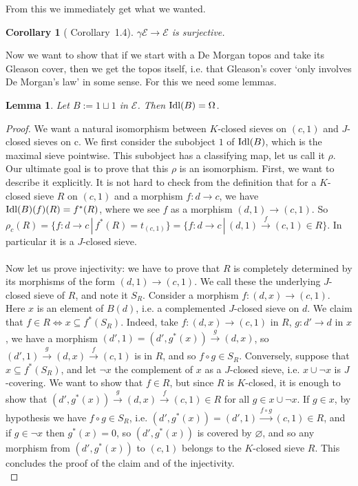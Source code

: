 \documentclass{article}
\newtheorem{Lemma}[theorem]{Lemma}
\newtheorem{corollary}[theorem]{Corollary}
\begin{document}
From this we immediately get what we wanted. 

\begin{corollary}[\cite{johnstone1980gleason} Corollary~1.4]\label{gc_surj}
$\gamma\mathcal{E}\xrightarrow{}\mathcal{E}$ is surjective.
\end{corollary}

Now we want to show that if we start with a De Morgan topos and take its Gleason cover, then we get the topos itself, i.e. that Gleason's cover `only involves De Morgan's law' in some sense. For this we need some lemmas.

\begin{Lemma}\label{1u1}
    Let $B:=1\sqcup 1$ in $\mathcal{E}$. Then $\textup{Idl}(B)=\Omega$.
\end{Lemma}
\begin{proof}
We want a natural isomorphism between $K$-closed sieves on $(c,1)$ and $J$-closed sieves on c. We first consider the subobject $1$ of $\textup{Idl}(B)$, which is the maximal sieve pointwise. This subobject has a classifying map, let us call it $\rho$. Our ultimate goal is to prove that this $\rho$ is an isomorphism. First, we want to describe it explicitly.  It is not hard to check from the definition that for a $K$-closed sieve $R$ on $(c,1)$ and a morphism $f:d\xrightarrow{}c$, we have $\textup{Idl}(B)(f)(R)=f^*(R)$, where we see $f$ as a morphism $(d,1)\xrightarrow{}(c,1)$. So $\rho_c(R)=\{f:d\xrightarrow{}c\,|\,f^*(R)=t_{(c,1)}\}=\{f:d\xrightarrow{}c\,|\,(d,1)\xrightarrow[]{f}(c,1)\in R\}$. In particular it is a $J$-closed sieve. \\
\\
Now let us prove injectivity: we have to prove that $R$ is completely determined by its morphisms of the form $(d,1)\xrightarrow{}(c,1)$. We call these the underlying $J$-closed sieve of $R$, and note it $S_R$. Consider a morphism $f:(d,x)\xrightarrow{}(c,1)$. Here $x$ is an element of $B(d)$, i.e. a complemented $J$-closed sieve on $d$. We claim that $f\in R\iff x\subseteq f^*(S_R)$. Indeed, take $f:(d,x)\xrightarrow{}(c,1)$ in $R$, $g:d'\xrightarrow{}d$ in $x$, we have a morphism $(d',1)=(d',g^*(x))\xrightarrow{g}(d,x)$, so $(d',1)\xrightarrow{g}(d,x)\xrightarrow{f}(c,1)$ is in $R$, and so $f\circ g\in S_R$. Conversely, suppose that $x\subseteq f^*(S_R)$, and let $\neg x$ the complement of $x$ as a $J$-closed sieve, i.e. $x\cup\neg x$ is $J$-covering. We want to show that $f\in R$, but since $R$ is $K$-closed, it is enough to show that $(d',g^*(x))\xrightarrow{g}(d,x)\xrightarrow{f}(c,1)\in R$ for all $g\in x\cup\neg x$. If $g\in x$, by hypothesis we have $f\circ g\in S_R$, i.e. $(d',g^*(x))=(d',1)\xrightarrow{f\circ g}(c,1)\in R$, and if $g\in\neg x$ then $g^*(x)=0$, so $(d',g^*(x))$ is covered by $\varnothing$, and so any morphism from $(d',g^*(x))$ to $(c,1)$ belongs to the $K$-closed sieve $R$. This concludes the proof of the claim and of the injectivity. \\

\end{proof}
\end{document}
